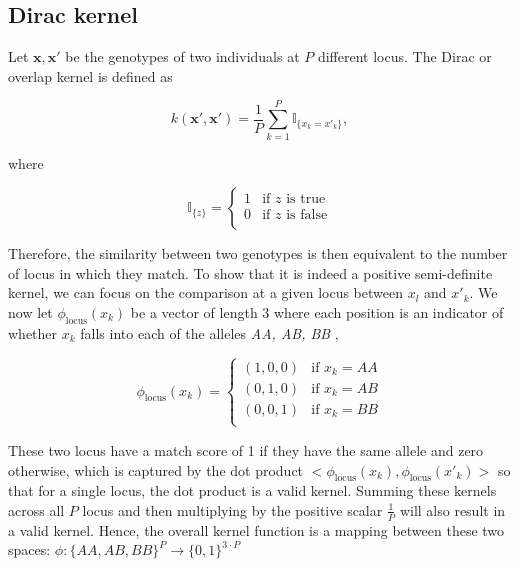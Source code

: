 \documentclass[a4paper, 11pt]{article}
\theoremstyle{definition}
\theoremstyle{remark}
\begin{document}
\subsection{Dirac kernel}

Let $\mathbf{x}, \mathbf{x'}$ be the genotypes of two individuals at $P$ different locus. The Dirac or overlap kernel is defined as

\begin{equation*}
    k(\mathbf{x'}, \mathbf{x'}) = \frac{1}{P}\sum_{k=1}^{P} \mathbb{I}_{\{x_k = x'_k\}},
\end{equation*}

where 

\begin{equation*}
    \mathbb{I}_{\{z\}} = 
    \begin{cases}
    1 & \text{if } z \text{ is true}\\
    0 & \text{if } z \text{ is false}\\
    \end{cases}
\end{equation*}


Therefore, the similarity between two genotypes is then equivalent to the number of locus in which they match. To show that it is indeed a positive semi-definite kernel, we can focus on the comparison at a given locus between $x_l$ and $x'_k$. We now let $\phi_{\text{locus}}(x_k)$ be a vector of length 3 where each position is an indicator of whether $x_k$ falls into each of the alleles \textit{AA, AB, BB} \cite{GenonicSimilarity},

\begin{equation*}
    \phi_{\text{locus}}(x_k) = \begin{cases}
        (1, 0, 0) & \text{if } x_k = AA \\
        (0, 1, 0) & \text{if } x_k = AB \\
        (0, 0, 1) & \text{if } x_k = BB \\
    \end{cases}
\end{equation*}

These two locus have a match score of 1 if they have the same allele and zero otherwise, which is captured by the dot product $<\phi_{\text{locus}}(x_k), \phi_{\text{locus}}(x'_k)>$ so that for a single locus, the dot product is a valid kernel. Summing these kernels across all $P$ locus and then multiplying by the positive scalar $\frac{1}{P}$ will also result in a valid kernel. Hence, the overall kernel function is a mapping between these two spaces:
$
    \phi : \{AA, AB, BB\}^P \rightarrow \{0, 1\}^{3\cdot P}
$
\end{document}
